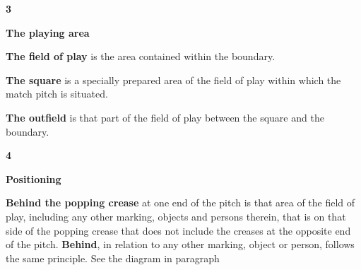 \documentclass[12pt]{article}
\begin{document}
\vspace{\baselineskip}
{\fontsize{16pt}{19.2pt}\selectfont \textbf{3 \tabto{0.29in} }{\fontsize{15pt}{18.0pt}\selectfont \textbf{The playing area}\par}\par}\par


\vspace{\baselineskip}
{\fontsize{9pt}{10.8pt} \tabto{0.39in} {\fontsize{8pt}{9.6pt}\selectfont \textbf{The field of play }is the area contained within the boundary.\par}\par}\par


\vspace{\baselineskip}
{\fontsize{9pt}{10.8pt} \tabto{0.39in} {\fontsize{8pt}{9.6pt}\selectfont \textbf{The square }is a specially prepared area of the field of play within which the match pitch is situated.\par}\par}\par


\vspace{\baselineskip}
{\fontsize{9pt}{10.8pt} \tabto{0.39in} {\fontsize{8pt}{9.6pt}\selectfont \textbf{The outfield }is that part of the field of play between the square and the boundary.\par}\par}\par


\vspace{\baselineskip}
{\fontsize{16pt}{19.2pt}\selectfont \textbf{4 \tabto{0.29in} }{\fontsize{15pt}{18.0pt}\selectfont \textbf{Positioning}\par}\par}\par


\vspace{\baselineskip}
\begin{adjustwidth}{0.4in}{0.19in}
{\fontsize{9pt}{10.8pt} \tabto{0.39in} \textbf{Behind the popping crease }at one end of the pitch is that area of the field of play, including any other\textbf{ }marking, objects and persons therein, that is on that side of the popping crease that does not include the creases at the opposite end of the pitch. \textbf{Behind}, in relation to any other marking, object or person, follows the same principle. See the diagram in paragraph \par}\par

\end{adjustwidth}
\end{document}
